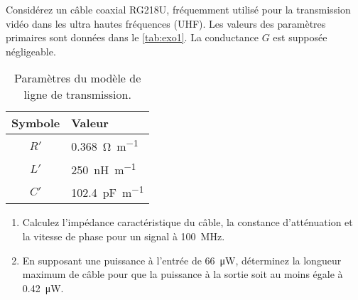 \documentclass [a4paper, 11pt] {article}
\begin{document}
    \begin{exercice}{1}
        Considérez un câble coaxial RG218U, fréquemment utilisé pour la transmission vidéo dans les ultra hautes fréquences (UHF). Les valeurs des paramètres primaires sont données dans le \autoref{tab:exo1}. La conductance $G$ est supposée négligeable.
        
        \begin{table}[H]
            \centering
            \begin{tabular}{cl}
                Symbole & Valeur \\
                \hline
                $R'$ & \SI{0.368}{\ohm\per\meter} \\
                $L'$ & \SI{250}{\nano\henry\per\meter} \\
                $C'$ & \SI{102.4}{\pico\farad\per\meter}
            \end{tabular}
            \caption{Paramètres du modèle de ligne de transmission.}
            \label{tab:exo1}
        \end{table}
        
        \begin{enumerate}
            \item Calculez l'impédance caractéristique du câble, la constance d'atténuation et la vitesse de phase pour un signal à \SI{100}{\mega\hertz}.
            \item En supposant une puissance à l'entrée de \SI{66}{\micro\watt}, déterminez la longueur maximum de câble pour que la puissance à la sortie soit au moins égale à \SI{0.42}{\micro\watt}.
        \end{enumerate}
    \end{exercice}
    
\end{document}
